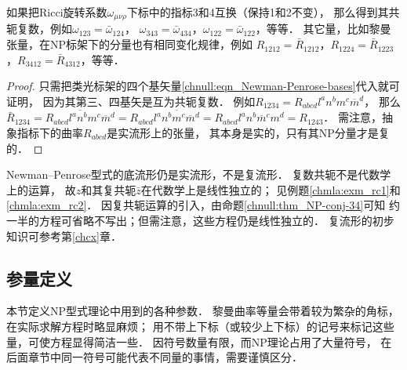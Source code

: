 \begin{proposition}\label{chnull:thm_NP-conj-34}
    如果把Ricci旋转系数$\omega_{\mu\nu\rho}$下标中的指标3和4互换（保持1和2不变），
    那么得到其共轭复数，例如$\omega_{123}=\bar{\omega}_{124}$，
    $\omega_{343}=\bar{\omega}_{434}$，$\omega_{122}=\bar{\omega}_{122}$，等等．
    其它量，比如黎曼张量，在NP标架下的分量也有相同变化规律，例如
    $R_{1212}=\bar{R}_{1212}$，$R_{1224}=\bar{R}_{1223}$，$R_{3412}=\bar{R}_{4312}$，等等．
\end{proposition}
\begin{proof}
    只需把类光标架的四个基矢量\eqref{chnull:eqn_Newman-Penrose-bases}代入就可证明，
    因为其第三、四基矢是互为共轭复数．
    例如$R_{1234}=R_{abcd}l^a n^b m^c \overline{m}^d $，
    那么$\bar{R}_{1234}=\overline{R_{abcd}l^a n^b m^c \overline{m}^d}
    =R_{abcd}\overline{l^a n^b m^c \overline{m}^d}
    =R_{abcd}l^a n^b \overline{m}^c {m}^d=R_{1243}$．
    需注意，抽象指标下的曲率$R_{abcd}$是实流形上的张量，
    其本身是实的，只有其NP分量才是复的．
\end{proof}
\begin{remark}
    Newman--Penrose型式的底流形仍是{\kaishu 实流形}，不是{\kaishu 复流形}．
    复数共轭不是{\kaishu 代数学}上的运算，
    故$z$和其复共轭$\bar{z}$在代数学上是线性独立的；
    见例题\ref{chmla:exm_rc1}和\ref{chmla:exm_rc2}．
    因复共轭运算的引入，由命题\ref{chnull:thm_NP-conj-34}可知
    约一半的方程可省略不写出；但需注意，这些方程仍是线性独立的．
    复流形的初步知识可参考第\ref{chcx}章．    %
\end{remark}


\subsection{参量定义}
本节定义NP型式理论中用到的各种参数．
黎曼曲率等量会带着较为繁杂的角标，在实际求解方程时略显麻烦；
用不带上下标（或较少上下标）的记号来标记这些量，可使方程显得简洁一些．
因符号数量有限，而NP理论占用了大量符号，
在后面章节中同一符号可能代表不同量的事情，需要谨慎区分．


